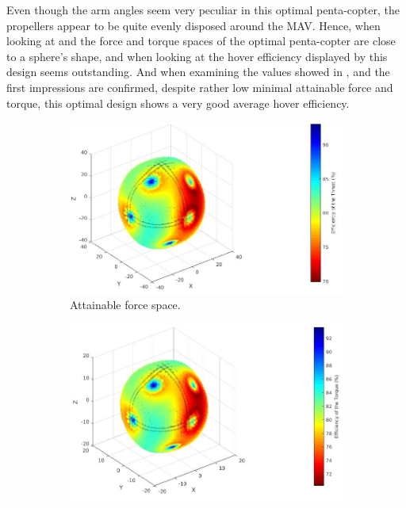 Even though the arm angles seem very peculiar in this optimal penta-copter, the
propellers appear to be quite evenly disposed around the MAV. Hence, when looking
at   and  the force and torque spaces
of the optimal penta-copter are close to a sphere’s shape, and when looking at
 the hover efficiency displayed by this design seems outstanding.
And when examining the values showed in ,
 and 
the first impressions are confirmed, despite rather low minimal attainable force and
torque, this optimal design shows a very good average hover efficiency.

\begin{figure}[!ht]
  \begin{center}
    \begin{subfigure}[b]{0.45\textwidth}
    \includegraphics[width=\linewidth]{images/Penta_fspace.jpg}
    \caption{Attainable force space.} \label{fig:penta_fspace}
    \end{subfigure}
    \hspace*{\fill} %
    \begin{subfigure}[b]{0.43\textwidth}
      \includegraphics[width=\linewidth]{images/Penta_tspace.jpg}

\end{subfigure}
\end{center}
\end{figure}
